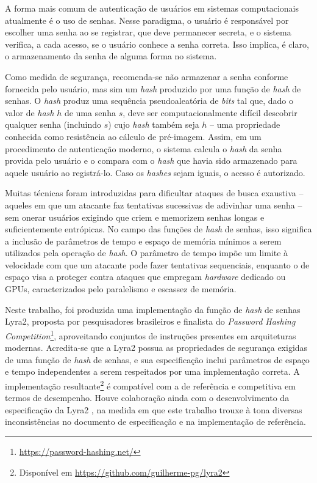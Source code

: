 \documentclass{article}
\begin{document}
A forma mais comum de autenticação de usuários em sistemas
computacionais atualmente é o uso de senhas. Nesse paradigma, o usuário
é responsável por escolher uma senha ao se registrar, que deve
permanecer secreta, e o sistema verifica, a cada acesso, se o usuário
conhece a senha correta. Isso implica, é claro, o armazenamento da senha
de alguma forma no sistema.

Como medida de segurança, recomenda-se não armazenar a senha conforme
fornecida pelo usuário, mas sim um \emph{hash} produzido por uma
função de \emph{hash} de senhas. O \emph{hash} produz uma sequência
pseudoaleatória de \emph{bits} tal que, dado o valor de \emph{hash} $h$ de uma senha
$s$, deve ser computacionalmente difícil descobrir qualquer senha
(incluindo $s$) cujo \emph{hash} também seja $h$ -- uma propriedade
conhecida como resistência ao cálculo de pré-imagem.
Assim, em um procedimento de autenticação moderno, o sistema calcula o
\emph{hash} da senha provida pelo usuário e o compara com o \emph{hash}
que havia sido armazenado para aquele usuário ao registrá-lo. Caso os
\emph{hashes} sejam iguais, o acesso é autorizado.

Muitas técnicas foram introduzidas para dificultar
ataques de busca exaustiva -- aqueles em que um atacante faz tentativas
sucessivas de adivinhar uma senha -- sem onerar usuários exigindo que
criem e memorizem senhas longas e suficientemente entrópicas.
No campo das funções de \emph{hash} de senhas, isso significa a inclusão
de parâmetros de tempo e espaço de memória mínimos a serem utilizados
pela operação de \emph{hash}. O parâmetro de tempo impõe um limite à
velocidade com que um atacante pode fazer tentativas sequenciais,
enquanto o de espaço visa a proteger contra ataques que empregam \emph{hardware}
dedicado ou GPUs, caracterizados pelo paralelismo e escassez de memória.

Neste trabalho, foi produzida uma implementação da
função de \emph{hash} de senhas Lyra2, proposta por pesquisadores
brasileiros e finalista do \emph{Password Hashing Competition}\footnote{\url{https://password-hashing.net/}}, aproveitando
conjuntos de instruções presentes em arquiteturas modernas. Acredita-se
que a Lyra2 possua as propriedades de segurança exigidas de uma função
de \emph{hash} de senhas, e sua especificação inclui parâmetros de espaço e tempo
independentes a serem respeitados por uma implementação correta.
A implementação resultante\footnote{Disponível em \url{https://github.com/guilherme-pg/lyra2}}
é compatível com a de referência e competitiva em termos de desempenho. Houve colaboração
ainda com o desenvolvimento da especificação da Lyra2 \cite{lyra2-spec},
na medida em que este trabalho trouxe à tona diversas 
inconsistências no documento de especificação e na implementação de referência.
\end{document}
